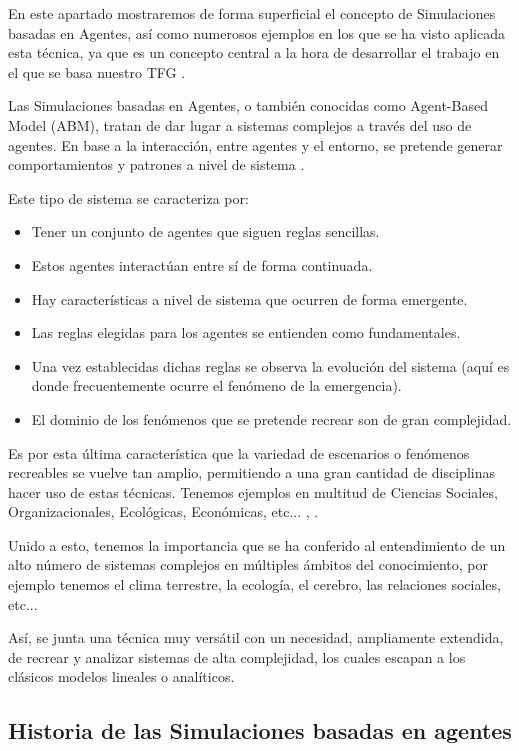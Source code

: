 En este apartado mostraremos de forma superficial el concepto de Simulaciones basadas en Agentes, así como numerosos ejemplos en los que se ha visto aplicada esta técnica, ya que es un concepto central a la hora de desarrollar el trabajo en el que se basa nuestro TFG \citep{park2023generative}.

Las Simulaciones basadas en Agentes, o también conocidas como Agent-Based Model (ABM), tratan de dar lugar a sistemas complejos a través del uso de agentes. En base a la interacción, entre agentes y el entorno, se pretende generar comportamientos y patrones a nivel de sistema \citep{bankes2002agent}.

Este tipo de sistema se caracteriza por:
\begin{itemize}
	\item Tener un conjunto de agentes que siguen reglas sencillas.
	\item Estos agentes interactúan entre sí de forma continuada.
	\item Hay características a nivel de sistema que ocurren de forma emergente.
	\item Las reglas elegidas para los agentes se entienden como fundamentales.
	\item Una vez establecidas dichas reglas se observa la evolución del sistema (aquí es donde frecuentemente ocurre el fenómeno de la emergencia).
	\item El dominio de los fenómenos que se pretende recrear son de gran complejidad.
\end{itemize}

Es por esta última característica que la variedad de escenarios o fenómenos recreables se vuelve tan amplio, permitiendo a una gran cantidad de disciplinas hacer uso de estas técnicas. Tenemos ejemplos en multitud de Ciencias Sociales, Organizacionales, Ecológicas, Económicas, etc... \citep{troitzsch2009perspectives}, \citep{heckbert2010agent}.

Unido a esto, tenemos la importancia que se ha conferido al entendimiento de un alto número de sistemas complejos en múltiples ámbitos del conocimiento, por ejemplo tenemos el clima terrestre, la ecología, el cerebro, las relaciones sociales, etc...

Así, se junta una técnica muy versátil con un necesidad, ampliamente extendida, de recrear y analizar sistemas de alta complejidad, los cuales escapan a los clásicos modelos lineales o analíticos.

\subsection{Historia de las Simulaciones basadas en agentes}

